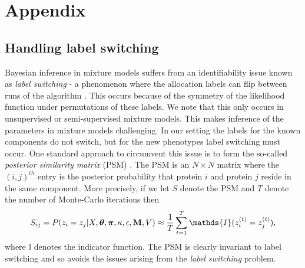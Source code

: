 \documentclass[12pt,english]{article}
\begin{document}
\section{Appendix}
\subsection{Handling label switching}
Bayesian inference in mixture models suffers from an identifiability issue known as \textit{label switching} - a phenomenon where the allocation labels can flip between runs of the algorithm \citep{Richardson::1997, Stephens:2000}. This occurs because of the symmetry of the likelihood function under permutations of these labels. We note that this only occurs in unsupervised or semi-supervised mixture models. This makes inference of the parameters in mixture models challenging. In our setting the labels for the known components do not switch, but for the new phenotypes label switching must occur. One standard approach to circumvent this issue is to form the so-called \textit{posterior similarity matrix} (PSM) \citep{fritsch::2009}. The PSM is an $N\times N$ matrix where the $(i,j)^{th}$ entry is the posterior probability that protein $i$ and protein $j$ reside in the same component. More precisely, if we let $S$ denote the PSM and $T$ denote the number of Monte-Carlo iterations then 
\begin{equation}
S_{ij} = P(z_i = z_j| X, \boldsymbol{\theta}, \boldsymbol{\pi} , \kappa, \epsilon, {\bf M}, V) \approx \frac{1}{T} \sum_{t = 1}^{T} \mathds{I}(z^{(t)}_i = z^{(t)}_j),
\end{equation}
where $\mathds{I}$ denotes the indicator function. The PSM is clearly invariant to label switching and so avoids the issues arising from the \textit{label switching} problem. 
\end{document}
